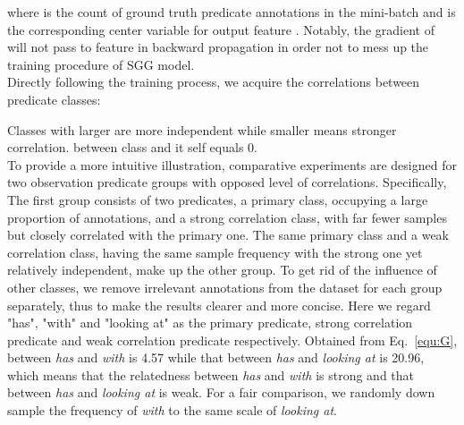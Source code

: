 \documentclass[sigconf]{acmart}
\begin{document}
where  is the count of ground truth predicate annotations in the mini-batch and  is the corresponding center variable for output feature .
Notably, the gradient of  will not pass to feature  in backward propagation in order not to mess up the training procedure of SGG model.
\\\indent Directly following the training process, we acquire the correlations between predicate classes:

Classes with larger  are more independent while smaller  means stronger correlation.  between class  and it self equals 0.
\\\indent To provide a more intuitive illustration, comparative experiments are designed for two observation predicate groups with opposed level of correlations. Specifically, The first group consists of two predicates, a primary class, occupying a large proportion of annotations, and a strong correlation class, with far fewer samples but closely correlated with the primary one. The same primary class and a weak correlation class, having the same sample frequency with the strong one yet relatively independent, make up the other group. To get rid of the influence of other classes, we remove irrelevant annotations from the dataset for each group separately, thus to make the results clearer and more concise. Here we regard "has", "with" and "looking at" as the primary predicate, strong correlation predicate and weak correlation predicate respectively. 
Obtained from Eq.~\ref{equ:G},  between \emph{has} and \emph{with} is 4.57 while that between \emph{has} and \emph{looking at} is 20.96, which means that the relatedness between \emph{has} and \emph{with} is strong and that between \emph{has} and \emph{looking at} is weak. For a fair comparison, we randomly down sample the frequency of \emph{with} to the same scale of \emph{looking at}.
\end{document}

